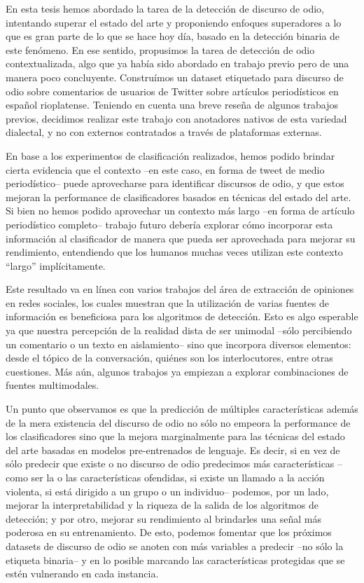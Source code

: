 En esta tesis hemos abordado la tarea de la detección de discurso de odio, intentando superar el estado del arte y proponiendo enfoques superadores a lo que es gran parte de lo que se hace hoy día, basado en la detección binaria de este fenómeno. En ese sentido, propusimos la tarea de detección de odio contextualizada, algo que ya había sido abordado en trabajo previo pero de una manera poco concluyente. Construímos un dataset etiquetado para discurso de odio sobre comentarios de usuarios de Twitter sobre artículos periodísticos en español rioplatense. Teniendo en cuenta una breve reseña de algunos trabajos previos, decidimos realizar este trabajo con anotadores nativos de esta variedad dialectal, y no con externos contratados a través de plataformas externas.

En base a los experimentos de clasificación realizados, hemos podido brindar cierta evidencia que el contexto --en este caso, en forma de tweet de medio periodístico-- puede aprovecharse para identificar discursos de odio, y que estos mejoran la performance de clasificadores basados en técnicas del estado del arte. Si bien no hemos podido aprovechar un contexto más largo --en forma de artículo periodístico completo-- trabajo futuro debería explorar cómo incorporar esta información al clasificador de manera que pueda ser aprovechada para mejorar su rendimiento, entendiendo que los humanos muchas veces utilizan este contexto ``largo'' implícitamente.

Este resultado va en línea con varios trabajos del área de extracción de opiniones en redes sociales, los cuales muestran que la utilización de varias fuentes de información es beneficiosa para los algoritmos de detección. Esto es algo esperable ya que nuestra percepción de la realidad dista de ser unimodal --sólo percibiendo un comentario o un texto en aislamiento-- sino que incorpora diversos elementos: desde el tópico de la conversación, quiénes son los interlocutores, entre otras cuestiones. Más aún, algunos trabajos ya empiezan a explorar combinaciones de fuentes multimodales.


Un punto que observamos es que la predicción de múltiples características además de la mera existencia del discurso de odio no sólo no empeora la performance de los clasificadores sino que la mejora marginalmente para las técnicas del estado del arte basadas en modelos pre-entrenados de lenguaje. Es decir, si en vez de sólo predecir que existe o no discurso de odio predecimos más características --como ser la o las características ofendidas, si existe un llamado a la acción violenta, si está dirigido a un grupo o un individuo-- podemos, por un lado, mejorar la interpretabilidad y la riqueza de la salida de los algoritmos de detección; y por otro, mejorar su rendimiento al brindarles una señal más poderosa en su entrenamiento. De esto, podemos fomentar que los próximos datasets de discurso de odio se anoten con más variables a predecir --no sólo la etiqueta binaria-- y en lo posible marcando las características protegidas que se estén vulnerando en cada instancia.


